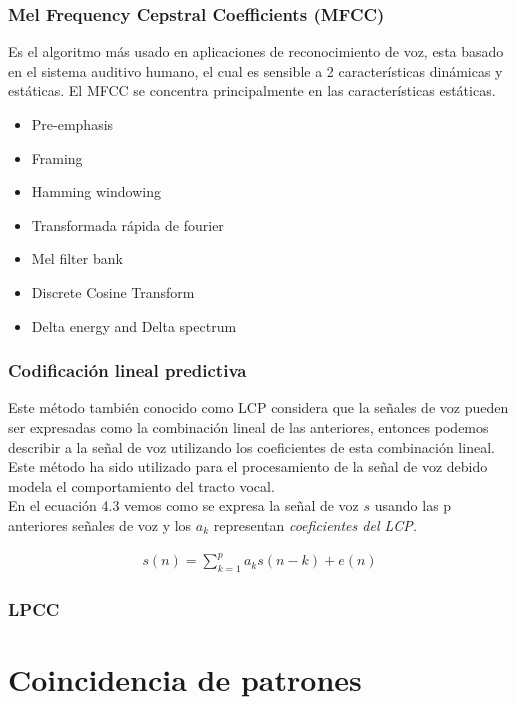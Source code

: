 \subsubsection{Mel Frequency Cepstral Coefficients (MFCC)} 
Es el algoritmo más usado en aplicaciones de reconocimiento de voz, esta basado en el sistema auditivo humano, el cual es sensible a 2 características dinámicas y estáticas. El MFCC se concentra principalmente en las características estáticas. 
\begin{itemize}
	\item Pre-emphasis
	\item Framing
	\item Hamming windowing
	\item Transformada rápida de fourier
	\item Mel filter bank
	\item Discrete Cosine Transform
	\item Delta energy and Delta spectrum
\end{itemize}
\subsubsection{Codificación lineal predictiva} 
Este método también conocido como LCP considera que la señales de voz pueden ser expresadas como la combinación lineal de las anteriores, entonces podemos describir a la señal de voz utilizando los coeficientes de esta combinación lineal. Este método ha sido utilizado para el procesamiento de la señal de voz debido modela el comportamiento del tracto vocal.\\ En el ecuación 4.3 vemos como se expresa la señal de voz $s$ usando las p anteriores señales de voz y los $a_{k}$ representan \textit{coeficientes del LCP.}

\begin{equation}
\label{LPC}
\begin{aligned}
s(n)= \sum_{k=1}^{p}a_{k}s(n-k)+e(n)
\end{aligned}
\end{equation}

\subsubsection{LPCC}

\section{Coincidencia de patrones}

